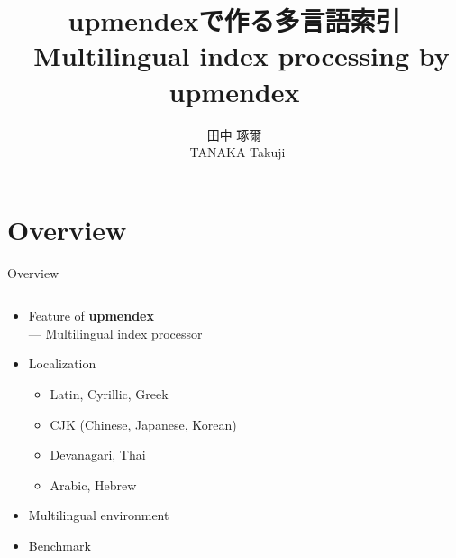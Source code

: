 \documentclass[aspectratio=169,10pt]{beamer}
\title{\textjapanese{upmendexで作る多言語索引}\\
~Multilingual index processing by upmendex}
\author{田中 琢爾\\~TANAKA Takuji}
\begin{document}

\begin{japanese}
\frame{\titlepage}
\end{japanese}

\section{Overview}
\begin{frame}{Overview}

\begin{columns}
\begin{column}{65mm}

  \begin{itemize}
  \item Feature of \textbf{upmendex}\\
     --- Multilingual index processor
  \item Localization
     \begin{itemize}
      \item Latin, Cyrillic, Greek
      \item CJK (Chinese, Japanese, Korean)
      \item Devanagari, Thai
      \item Arabic, Hebrew
     \end{itemize}
  \item Multilingual environment
  \item Benchmark
  \end{itemize}
\end{column}

\begin{column}{65mm}

\begin{center}
\end{center}
\end{column}
\end{columns}

\end{frame}
\end{document}
